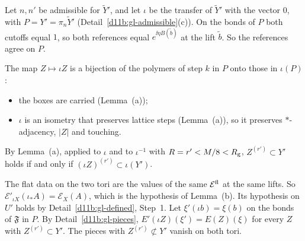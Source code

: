 \begin{step}
Let $n,n'$ be admissible for $\tilde Y'$, and let $\iota$ be the transfer of $\tilde Y'$ with the vector $0$, with $P=Y'=\pi_n\tilde Y'$ (Detail~\ref{d11b:gl-admissible}(c)). On the bonds of $P$ both cutoffs equal $1$, so both references equal $e^{\ii\eta B(\tilde b)}$ at the lift $\tilde b$. So the references agree on $P$.

The map $Z\mapsto\iota Z$ is a bijection of the polymers of step $k$ in $P$ onto those in $\iota(P)$:
\begin{itemize}
\item the boxes are carried (Lemma~(a));
\item $\iota$ is an isometry that preserves lattice steps (Lemma~(a)), so it preserves $*$-adjacency, $|Z|$ and touching.
\end{itemize}
By Lemma~(a), applied to $\iota$ and to $\iota^{-1}$ with $R=r'<M/8<R_{\rm g}$, $Z^{(r')}\subset Y'$ holds if and only if $(\iota Z)^{(r')}\subset\iota(Y')$.

The flat data on the two tori are the values of the same $\mathcal E^{\rm fl}$ at the same lifts. So $\mathcal E'_{\iota X}(\iota_*A)=\mathcal E_X(A)$, which is the hypothesis of Lemma~(b). Its hypothesis on $U'$ holds by Detail~\ref{d11b:gl-defined}, Step~1. Let $\xi'(\iota b)=\xi(b)$ on the bonds of $\mathfrak F$ in $P$. By Detail~\ref{d11b:gl-pieces}, $E'(\iota Z)(\xi')=E(Z)(\xi)$ for every $Z$ with $Z^{(r')}\subset Y'$. The pieces with $Z^{(r')}\not\subset Y'$ vanish on both tori.
\end{step}

